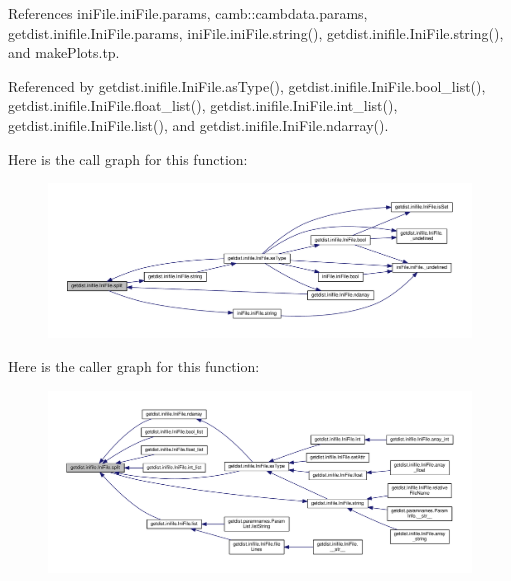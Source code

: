 References ini\+File.\+ini\+File.\+params, camb\+::cambdata.\+params, getdist.\+inifile.\+Ini\+File.\+params, ini\+File.\+ini\+File.\+string(), getdist.\+inifile.\+Ini\+File.\+string(), and make\+Plots.\+tp.



Referenced by getdist.\+inifile.\+Ini\+File.\+as\+Type(), getdist.\+inifile.\+Ini\+File.\+bool\+\_\+list(), getdist.\+inifile.\+Ini\+File.\+float\+\_\+list(), getdist.\+inifile.\+Ini\+File.\+int\+\_\+list(), getdist.\+inifile.\+Ini\+File.\+list(), and getdist.\+inifile.\+Ini\+File.\+ndarray().

Here is the call graph for this function\+:
\nopagebreak
\begin{figure}[H]
\begin{center}
\leavevmode
\includegraphics[width=350pt]{classgetdist_1_1inifile_1_1IniFile_a3a4d9c8fd7a2274730473c3df2f5a44e_cgraph}
\end{center}
\end{figure}
Here is the caller graph for this function\+:
\nopagebreak
\begin{figure}[H]
\begin{center}
\leavevmode
\includegraphics[width=350pt]{classgetdist_1_1inifile_1_1IniFile_a3a4d9c8fd7a2274730473c3df2f5a44e_icgraph}
\end{center}
\end{figure}
\mbox{\label{classgetdist_1_1inifile_1_1IniFile_aaff273830dd59c896a75b71391677d99}} 
